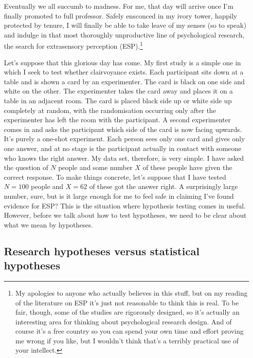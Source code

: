 \documentclass[
  a4paper,
]{book}
\begin{document}
Eventually we all succumb to madness. For me, that day will arrive once
I'm finally promoted to full professor. Safely ensconced in my ivory
tower, happily protected by tenure, I will finally be able to take leave
of my senses (so to speak) and indulge in that most thoroughly
unproductive line of psychological research, the search for extrasensory
perception (ESP).\footnote{My apologies to anyone who actually believes
  in this stuff, but on my reading of the literature on ESP it's just
  not reasonable to think this is real. To be fair, though, some of the
  studies are rigorously designed, so it's actually an interesting area
  for thinking about psychological research design. And of course it's a
  free country so you can spend your own time and effort proving me
  wrong if you like, but I wouldn't think that's a terribly practical
  use of your intellect.}

Let's suppose that this glorious day has come. My first study is a
simple one in which I seek to test whether clairvoyance exists. Each
participant sits down at a table and is shown a card by an experimenter.
The card is black on one side and white on the other. The experimenter
takes the card away and places it on a table in an adjacent room. The
card is placed black side up or white side up completely at random, with
the randomisation occurring only after the experimenter has left the
room with the participant. A second experimenter comes in and asks the
participant which side of the card is now facing upwards. It's purely a
one-shot experiment. Each person sees only one card and gives only one
answer, and at no stage is the participant actually in contact with
someone who knows the right answer. My data set, therefore, is very
simple. I have asked the question of \(N\) people and some number \(X\)
of these people have given the correct response. To make things
concrete, let's suppose that I have tested \(N = 100\) people and
\(X = 62\) of these got the answer right. A surprisingly large number,
sure, but is it large enough for me to feel safe in claiming I've found
evidence for ESP? This is the situation where hypothesis testing comes
in useful. However, before we talk about how to test hypotheses, we need
to be clear about what we mean by hypotheses.

\hypertarget{research-hypotheses-versus-statistical-hypotheses}{%
\subsection{Research hypotheses versus statistical
hypotheses}\label{research-hypotheses-versus-statistical-hypotheses}}
\end{document}
